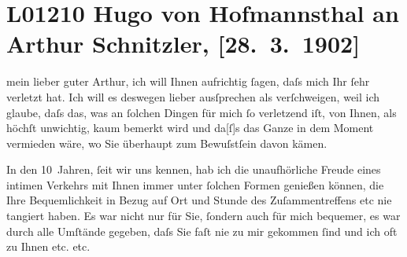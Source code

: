 

\section[Hugo von Hofmannsthal an Arthur Schnitzler, {[}28. 3. 1902{]}]{L01210 Hugo von Hofmannsthal an Arthur Schnitzler, {[}28. 3. 1902{]}}
\nopagebreak{}
\rehead{ }\normalsize\beginnumbering{}
\toendnotes[C]{\smallbreak\pagebreak[2]}
\toendnotes[C]{\smallbreak}
\toendnotes[C]{\smallbreak}
\pstart{}{\pb}mein lieber guter
                  Arthur,\pend\vspace{0.5em}
\pstart
           ich will Ihnen aufrichtig{ }ſagen, daſs mich Ihr \label{K_L01210-55v}\label{K_L01210-55}{ }ſehr verletzt hat. Ich will
               es deswegen lieber ausſprechen als verſchweigen, weil ich glaube, daſs das, was an{ }ſolchen Dingen für mich{ }ſo verletzend iſt, von Ihnen, als höchſt unwichtig, kaum {\pb}bemerkt wird und
                  da{[}ſ{]}s das Ganze in dem Moment vermieden wäre, wo Sie überhaupt
               zum Bewuſstſein davon kämen.\pend
           
\pstart
           In den 10 Jahren,{ }ſeit wir uns kennen, hab ich die unaufhörliche Freude eines intimen
               Verkehrs mit Ihnen immer unter{ }ſolchen Formen {\pb}genießen können, die Ihre
               Bequemlichkeit in Bezug auf Ort und Stunde des Zuſammentreffens etc nie tangiert
               haben. Es war nicht nur für Sie,{ }ſondern auch für mich bequemer, es war durch alle
               Umſtände gegeben, daſs Sie faſt nie zu mir gekommen{ }ſind und ich oft zu Ihnen etc.
               etc.\pend
           
